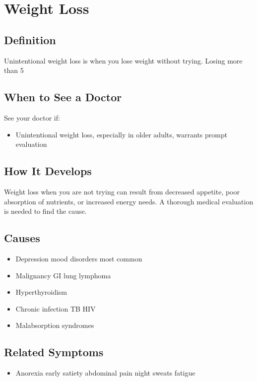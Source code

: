 \chapter{Weight Loss}

\section*{Definition}
Unintentional weight loss is when you lose weight without trying. Losing more than 5%

\section*{When to See a Doctor}
See your doctor if:
\begin{itemize}
  \item Unintentional weight loss, especially in older adults, warrants prompt evaluation
\end{itemize}

\section*{How It Develops}
Weight loss when you are not trying can result from decreased appetite, poor absorption of nutrients, or increased energy needs. A thorough medical evaluation is needed to find the cause.

\section*{Causes}
\begin{itemize}
  \item Depression mood disorders most common
  \item Malignancy GI lung lymphoma
  \item Hyperthyroidism
  \item Chronic infection TB HIV
  \item Malabsorption syndromes
\end{itemize}

\section*{Related Symptoms}
\begin{itemize}
  \item Anorexia early satiety abdominal pain night sweats fatigue
\end{itemize}

